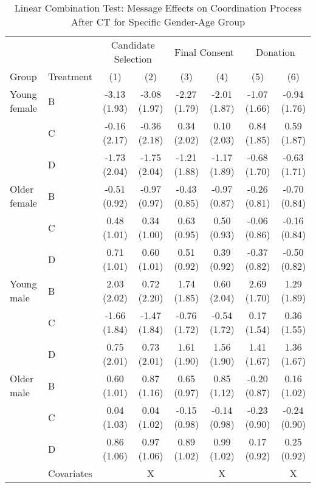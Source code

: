 \documentclass[12pt, a4paper]{article}
\begin{document}
\begin{table}[H]

\caption{\label{tab:lh-interaction-gender-age-coordinate}Linear Combination Test: Message Effects on Coordination Process After CT for Specific Gender-Age Group}
\centering
\fontsize{8}{10}\selectfont
\begin{threeparttable}
\begin{tabular}[t]{llcccccc}
\toprule
\multicolumn{2}{c}{ } & \multicolumn{2}{c}{Candidate Selection} & \multicolumn{2}{c}{Final Consent} & \multicolumn{2}{c}{Donation} \\
\cmidrule(l{3pt}r{3pt}){3-4} \cmidrule(l{3pt}r{3pt}){5-6} \cmidrule(l{3pt}r{3pt}){7-8}
Group & Treatment & (1) & (2) & (3) & (4) & (5) & (6)\\
\midrule
Young female & B & -3.13 (1.93) & -3.08 (1.97) & -2.27 (1.79) & -2.01 (1.87) & -1.07 (1.66) & -0.94 (1.76)\\
 & C & -0.16 (2.17) & -0.36 (2.18) & 0.34 (2.02) & 0.10 (2.03) & 0.84 (1.85) & 0.59 (1.87)\\
 & D & -1.73 (2.04) & -1.75 (2.04) & -1.21 (1.88) & -1.17 (1.89) & -0.68 (1.70) & -0.63 (1.71)\\
Older female & B & -0.51 (0.92) & -0.97 (0.97) & -0.43 (0.85) & -0.97 (0.87) & -0.26 (0.81) & -0.70 (0.84)\\
 & C & 0.48 (1.01) & 0.34 (1.00) & 0.63 (0.95) & 0.50 (0.93) & -0.06 (0.86) & -0.16 (0.84)\\
 & D & 0.71 (1.01) & 0.60 (1.01) & 0.51 (0.92) & 0.39 (0.92) & -0.37 (0.82) & -0.50 (0.82)\\
Young male & B & 2.03 (2.02) & 0.72 (2.20) & 1.74 (1.85) & 0.60 (2.04) & 2.69 (1.70) & 1.29 (1.89)\\
 & C & -1.66 (1.84) & -1.47 (1.84) & -0.76 (1.72) & -0.54 (1.72) & 0.17 (1.54) & 0.36 (1.55)\\
 & D & 0.75 (2.01) & 0.73 (2.01) & 1.61 (1.90) & 1.56 (1.90) & 1.41 (1.67) & 1.36 (1.67)\\
Older male & B & 0.60 (1.01) & 0.87 (1.16) & 0.65 (0.97) & 0.85 (1.12) & -0.20 (0.87) & 0.16 (1.02)\\
 & C & 0.04 (1.03) & 0.04 (1.02) & -0.15 (0.98) & -0.14 (0.98) & -0.23 (0.90) & -0.24 (0.90)\\
 & D & 0.86 (1.06) & 0.97 (1.06) & 0.89 (1.02) & 0.99 (1.02) & 0.17 (0.92) & 0.25 (0.92)\\
\midrule
 & Covariates &  & X &  & X &  & X\\
\bottomrule
\end{tabular}

\end{threeparttable}
\end{table}
\end{document}
